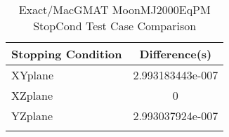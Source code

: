 \begin{table}[htbp!]
\centering
\caption{ Exact/MacGMAT MoonMJ2000EqPM StopCond Test Case Comparison}
      \begin{tabular}{lc}
      \hline\hline
          Stopping Condition & Difference(s) \\
         \hline
         XYplane & 2.993183443e-007 \\
         XZplane & 0 \\
         YZplane & 2.993037924e-007 \\
      \hline\hline
      \label{Table: Exact-MacGMAT MoonMJ2000EqPM StopCond Table} 
\end{tabular}
\end{table}
